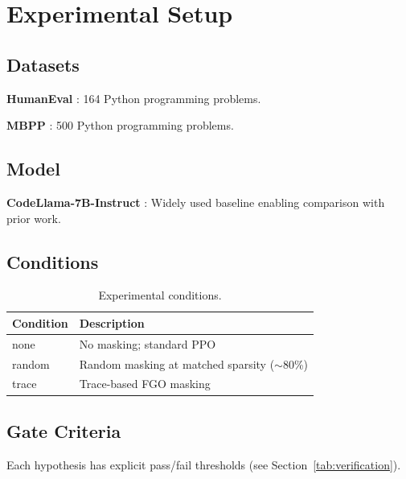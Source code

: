 \section{Experimental Setup}

\subsection{Datasets}

\textbf{HumanEval} \citep{chen2021humaneval}: 164 Python programming problems.

\textbf{MBPP} \citep{austin2021mbpp}: 500 Python programming problems.

\subsection{Model}

\textbf{CodeLlama-7B-Instruct} \citep{roziere2023codellama}: Widely used baseline enabling comparison with prior work.

\subsection{Conditions}

\begin{table}[h]
\centering
\caption{Experimental conditions.}
\label{tab:conditions}
\begin{tabular}{@{}ll@{}}
\toprule
Condition & Description \\
\midrule
none & No masking; standard PPO \\
random & Random masking at matched sparsity ($\sim$80\%) \\
trace & Trace-based FGO masking \\
\bottomrule
\end{tabular}
\end{table}

\subsection{Gate Criteria}

Each hypothesis has explicit pass/fail thresholds (see Section~\ref{tab:verification}).
